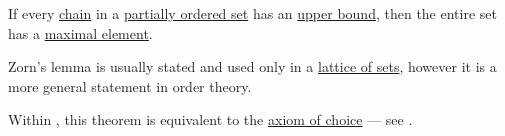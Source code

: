 \begin{theorem}\label{thm:zorns_lemma}
  If every \hyperref[def:partially_ordered_set_chain_and_antichain]{chain} in a \hyperref[def:partially_ordered_set]{partially ordered set} has an \hyperref[def:partially_ordered_set_extremal_points/upper_and_lower_bounds]{upper bound}, then the entire set has a \hyperref[def:partially_ordered_set_extremal_points/maximal_and_minimal_element]{maximal element}.

  Zorn's lemma is usually stated and used only in a \hyperref[thm:boolean_algebra_of_subsets]{lattice of sets}, however it is a more general statement in order theory.

  Within \hyperref[def:zfc]{}, this theorem is equivalent to the \hyperref[def:zfc/choice]{axiom of choice} --- see .
\end{theorem}
